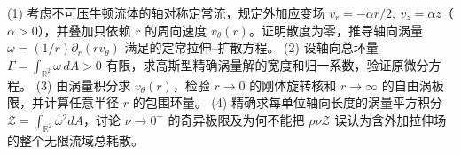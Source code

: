 (1) 考虑不可压牛顿流体的轴对称定常流，规定外加应变场 \(v_r=-\alpha r/2,\ v_z=\alpha z\)（\(\alpha>0\)），并叠加只依赖 \(r\) 的周向速度 \(v_\theta(r)\)。证明散度为零，推导轴向涡量 \(\omega=(1/r)\partial_r(rv_\theta)\) 满足的定常拉伸--扩散方程。
(2) 设轴向总环量 \(\Gamma=\int_{\mathbb R^2}\omega\,dA>0\) 有限，求高斯型精确涡量解的宽度和归一系数，验证原微分方程。
(3) 由涡量积分求 \(v_\theta(r)\)，检验 \(r\to0\) 的刚体旋转核和 \(r\to\infty\) 的自由涡极限，并计算任意半径 \(r\) 的包围环量。
(4) 精确求每单位轴向长度的涡量平方积分 \(\mathcal Z=\int_{\mathbb R^2}\omega^2dA\)，讨论 \(\nu\to0^+\) 的奇异极限及为何不能把 \(\rho\nu\mathcal Z\) 误认为含外加拉伸场的整个无限流域总耗散。
